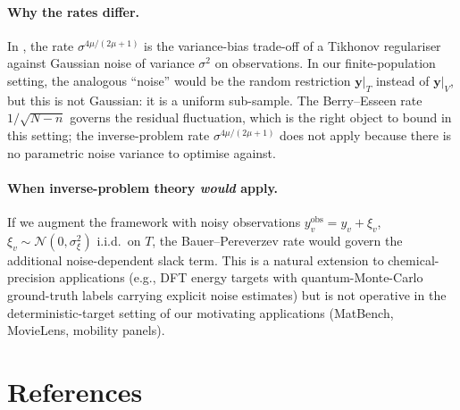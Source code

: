 \documentclass[11pt,a4paper]{article}
\theoremstyle{plain}
\theoremstyle{definition}
\theoremstyle{remark}
\newcommand{\by}{\mathbf{y}}
\begin{document}
\paragraph{Why the rates differ.}  In \citet{BauerPereverzev2005}, the
rate $\sigma^{4\mu/(2\mu+1)}$ is the variance-bias trade-off of a
Tikhonov regulariser against Gaussian noise of variance $\sigma^2$ on
observations.  In our finite-population setting, the analogous
``noise'' would be the random restriction $\by|_T$ instead of $\by|_V$,
but this is not Gaussian: it is a uniform sub-sample.  The
Berry--Esseen rate $1/\sqrt{N-n}$ governs the residual fluctuation,
which is the right object to bound in this setting; the inverse-problem
rate $\sigma^{4\mu/(2\mu+1)}$ does not apply because there is no
parametric noise variance to optimise against.

\paragraph{When inverse-problem theory \emph{would} apply.}  If we
augment the framework with noisy observations $y_v^{\mathrm{obs}} = y_v
+ \xi_v$, $\xi_v \sim \mathcal{N}(0, \sigma_\xi^2)$ i.i.d.\ on $T$,
the Bauer--Pereverzev rate would govern the additional noise-dependent
slack term.  This is a natural extension to chemical-precision
applications (e.g., DFT energy targets with quantum-Monte-Carlo
ground-truth labels carrying explicit noise estimates) but is not
operative in the deterministic-target setting of our motivating
applications (MatBench, MovieLens, mobility panels).

\section*{References}

\end{document}
